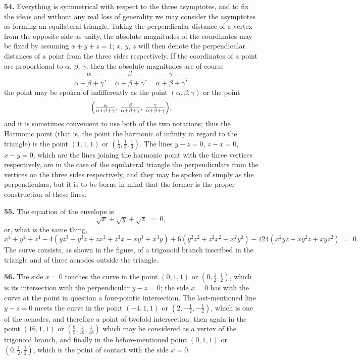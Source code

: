 \documentclass[11pt,a4paper]{article}
\begin{document}
\textbf{54.} Everything is symmetrical with respect to the three asymptotes, and to fix the ideas and without any real loss of generality we may consider the asymptotes as forming an equilateral triangle. Taking the perpendicular distance of a vertex from the opposite side as unity, the absolute magnitudes of the coordinates may be fixed by assuming $x+y+z=1$; $x$, $y$, $z$ will then denote the perpendicular distances of a point from the three sides respectively. If the coordinates of a point are proportional to $\alpha$, $\beta$, $\gamma$, then the absolute magnitudes are of course
\[
\frac{\alpha}{\alpha+\beta+\gamma},\quad\frac{\beta}{\alpha+\beta+\gamma},\quad\frac{\gamma}{\alpha+\beta+\gamma};
\]
the point may be spoken of indifferently as the point $(\alpha,\beta,\gamma)$ or the point
\[
\Bigl(\tfrac{\alpha}{\alpha+\beta+\gamma},\,\tfrac{\beta}{\alpha+\beta+\gamma},\,\tfrac{\gamma}{\alpha+\beta+\gamma}\Bigr),
\]
and it is sometimes convenient to use both of the two notations; thus the Harmonic point (that is, the point the harmonic of infinity in regard to the triangle) is the point $(1,1,1)$ or $(\tfrac{1}{3},\tfrac{1}{3},\tfrac{1}{3})$. The lines $y-z=0$, $z-x=0$, $x-y=0$, which are the lines joining the harmonic point with the three vertices respectively, are in the case of the equilateral triangle the perpendiculars from the vertices on the three sides respectively, and they may be spoken of simply as the perpendiculars, but it is to be borne in mind that the former is the proper construction of these lines.

\medskip

\textbf{55.} The equation of the envelope is
\[
\sqrt{x}+\sqrt{y}+\sqrt{z} \;=\; 0,
\]
or, what is the same thing,
\[
x^{4}+y^{4}+z^{4} - 4(yz^{3}+y^{3}z+zx^{3}+z^{3}x+xy^{3}+x^{3}y) + 6(y^{2}z^{2}+z^{2}x^{2}+x^{2}y^{2}) - 124(x^{2}yz+xy^{2}z+xyz^{2}) \;=\; 0.
\]
The curve consists, as shown in the figure, of a trigonoid branch inscribed in the triangle and of three acnodes outside the triangle.

\medskip

\textbf{56.} The side $x=0$ touches the curve in the point $(0,1,1)$ or $(0,\tfrac{1}{2},\tfrac{1}{2})$, which is its intersection with the perpendicular $y-z=0$; the side $x=0$ has with the curve at the point in question a four-pointic intersection. The last-mentioned line $y-z=0$ meets the curve in the point $(-4,1,1)$ or $(2,-\tfrac{1}{2},-\tfrac{1}{2})$, which is one of the acnodes, and therefore a point of twofold intersection; then again in the point $(16,1,1)$ or $(\tfrac{8}{9},\tfrac{1}{18},\tfrac{1}{18})$ which may be considered as a vertex of the trigonoid branch, and finally in the before-mentioned point $(0,1,1)$ or $(0,\tfrac{1}{2},\tfrac{1}{2})$, which is the point of contact with the side $x=0$.
\end{document}
